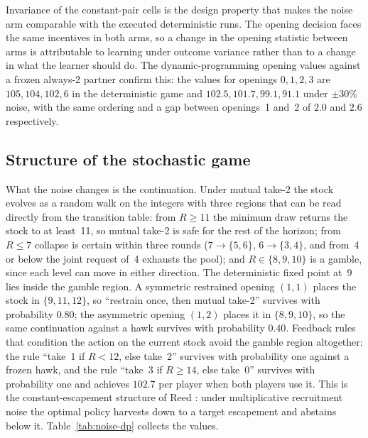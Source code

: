 Invariance of the constant-pair cells is the design property that makes
the noise arm comparable with the executed deterministic runs.
The opening decision faces the same incentives in both arms, so a change in
the opening statistic between arms is attributable to learning under
outcome variance rather than to a change in what the learner should do.
The dynamic-programming opening values against a frozen always-2 partner
confirm this: the values for openings \(0,1,2,3\) are
\(105, 104, 102, 6\) in the deterministic game and
\(102.5, 101.7, 99.1, 91.1\) under \(\pm 30\%\) noise, with the same
ordering and a gap between openings~1 and~2 of \(2.0\) and \(2.6\)
respectively.

\subsection{Structure of the stochastic game}

What the noise changes is the continuation.
Under mutual take-2 the stock evolves as a random walk on the integers with
three regions that can be read directly from the transition table:
from \(R \ge 11\) the minimum draw returns the stock to at least~11, so
mutual take-2 is safe for the rest of the horizon;
from \(R \le 7\) collapse is certain within three rounds
(\(7 \to \{5,6\}\), \(6 \to \{3,4\}\), and from~4 or below the joint
request of~4 exhausts the pool);
and \(R \in \{8, 9, 10\}\) is a gamble, since each level can move in
either direction.
The deterministic fixed point at~9 lies inside the gamble region.
A symmetric restrained opening \((1,1)\) places the stock in
\(\{9, 11, 12\}\), so ``restrain once, then mutual take-2'' survives with
probability \(0.80\); the asymmetric opening \((1,2)\) places it in
\(\{8, 9, 10\}\), so the same continuation against a hawk survives with
probability \(0.40\).
Feedback rules that condition the action on the current stock avoid the
gamble region altogether: the rule ``take~1 if \(R < 12\), else take~2''
survives with probability one against a frozen hawk, and the rule
``take~3 if \(R \ge 14\), else take~0'' survives with probability one and
achieves \(102.7\) per player when both players use it.
This is the constant-escapement structure of Reed \cite{reed1979}: under
multiplicative recruitment noise the optimal policy harvests down to a
target escapement and abstains below it.
Table~\ref{tab:noise-dp} collects the values.

